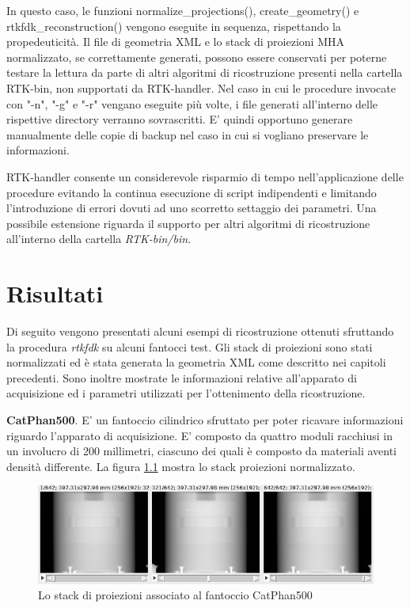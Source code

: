 \documentclass[a4paper,12pt, doubleside]{report}
\begin{document}
                In questo caso, le funzioni normalize\_projections(), create\_geometry() e rtkfdk\_reconstruction() vengono eseguite in sequenza, rispettando la propedeuticità. Il file di geometria XML e lo stack di proiezioni MHA normalizzato, se correttamente generati, possono essere conservati per poterne testare la lettura da parte di altri algoritmi di ricostruzione presenti nella cartella RTK-bin, non supportati da RTK-handler. Nel caso in cui le procedure invocate con "-n", "-g" e "-r" vengano eseguite più volte, i file generati all'interno delle rispettive directory verranno sovrascritti. E' quindi opportuno generare manualmente delle copie di backup nel caso in cui si vogliano preservare le informazioni.
                
            \bigskip
            \par
                RTK-handler consente un considerevole risparmio di tempo nell'applicazione delle procedure evitando la continua esecuzione di script indipendenti e limitando l'introduzione di errori dovuti ad uno scorretto settaggio dei parametri. Una possibile estensione riguarda il supporto per altri algoritmi di ricostruzione all'interno della cartella \textit{RTK-bin/bin}.
            
    \chapter{Risultati}
            \par
                Di seguito vengono presentati alcuni esempi di ricostruzione ottenuti sfruttando la procedura \textit{rtkfdk} su alcuni fantocci test. Gli stack di proiezioni sono stati normalizzati ed è stata generata la geometria XML come descritto nei capitoli precedenti. Sono inoltre mostrate le informazioni relative all'apparato di acquisizione ed i parametri utilizzati per l'ottenimento della ricostruzione.
                
            \bigskip
            \par
                \textbf{CatPhan500}. E' un fantoccio cilindrico sfruttato per poter ricavare informazioni riguardo l'apparato di acquisizione. E' composto da quattro moduli \cite{catphan-doc} racchiusi in un involucro di 200 millimetri, ciascuno dei quali è composto da materiali aventi densità differente. La figura \ref{fig:cat_proj} mostra lo stack proiezioni normalizzato.

                \begin{figure}[h]
                    \centering
                    \includegraphics[width=1\textwidth]{cat_proj}
                    \caption{Lo stack di proiezioni associato al fantoccio CatPhan500}
                    \label{fig:cat_proj}
                \end{figure}
                
\end{document}
